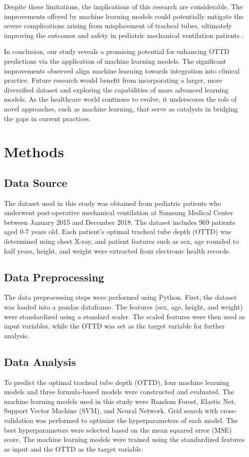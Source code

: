 \documentclass[11pt]{article}
\begin{document}
Despite these limitations, the implications of this research are considerable. The improvements offered by machine learning models could potentially mitigate the severe complications arising from misplacement of tracheal tubes, ultimately improving the outcomes and safety in pediatric mechanical ventilation patients \cite{Rost2022TrachealTM}. 

In conclusion, our study reveals a promising potential for enhancing OTTD predictions via the application of machine learning models. The significant improvements observed align machine learning towards integration into clinical practice. Future research would benefit from incorporating a larger, more diversified dataset and exploring the capabilities of more advanced learning models. As the healthcare world continues to evolve, it underscores the role of novel approaches, such as machine learning, that serve as catalysts in bridging the gaps in current practices.

\section*{Methods}

\subsection*{Data Source}
The dataset used in this study was obtained from pediatric patients who underwent post-operative mechanical ventilation at Samsung Medical Center between January 2015 and December 2018. The dataset includes 969 patients aged 0-7 years old. Each patient's optimal tracheal tube depth (OTTD) was determined using chest X-ray, and patient features such as sex, age rounded to half years, height, and weight were extracted from electronic health records.

\subsection*{Data Preprocessing}
The data preprocessing steps were performed using Python. First, the dataset was loaded into a pandas dataframe. The features (sex, age, height, and weight) were standardized using a standard scaler. The scaled features were then used as input variables, while the OTTD was set as the target variable for further analysis.

\subsection*{Data Analysis}
To predict the optimal tracheal tube depth (OTTD), four machine learning models and three formula-based models were constructed and evaluated. The machine learning models used in this study were Random Forest, Elastic Net, Support Vector Machine (SVM), and Neural Network. Grid search with cross-validation was performed to optimize the hyperparameters of each model. The best hyperparameters were selected based on the mean squared error (MSE) score. The machine learning models were trained using the standardized features as input and the OTTD as the target variable.
\end{document}

